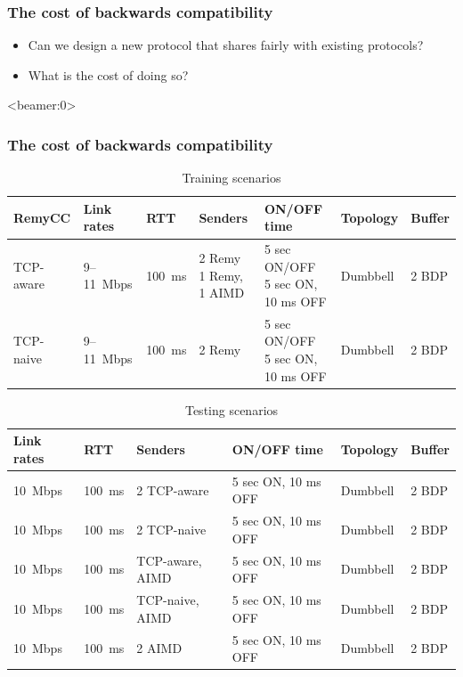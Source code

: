 \begin{frame}
\frametitle{The cost of backwards compatibility}
\begin{center}
\begin{itemize}
\item<1-> Can we design a new protocol that shares fairly with existing protocols?
\item<2-> What is the cost of doing so?
\end{itemize}
\end{center}
\end{frame}

\begin{frame}<beamer:0>
\frametitle{The cost of backwards compatibility}
\begin{table}
\begin{center}
\begin{tiny}
\begin{tabular}{l|l|l|l|l|l|l|}
\bf RemyCC & \bf Link rates & \bf RTT & \bf Senders & ON/OFF time & Topology & Buffer \\
\hline
TCP-aware  & 9--11~Mbps & 100~ms & \pbox{2.5cm}{2 Remy \\ 1 Remy, 1 AIMD}  & \pbox{2.5cm}{5 sec ON/OFF \\ 5 sec ON, 10 ms OFF} & Dumbbell & 2 BDP\\
\hline
TCP-naive  & 9--11~Mbps & 100~ms & 2 Remy  & \pbox{2.5cm}{5 sec ON/OFF \\ 5 sec ON, 10 ms OFF} & Dumbbell & 2 BDP\\
\hline
\end{tabular}
\end{tiny}
\caption{Training scenarios}
\label{table:oprange}
\end{center}
\end{table}
\begin{table}
\begin{center}
\begin{tiny}
\begin{tabular}{l|l|l|l|l|l|}
\bf Link rates & \bf RTT & \bf Senders & ON/OFF time & Topology & Buffer \\
\hline
10~Mbps & 100~ms & 2 TCP-aware & 5 sec ON, 10 ms OFF & Dumbbell & 2 BDP\\
10~Mbps & 100~ms & 2 TCP-naive & 5 sec ON, 10 ms OFF & Dumbbell & 2 BDP\\
10~Mbps & 100~ms & TCP-aware, AIMD & 5 sec ON, 10 ms OFF & Dumbbell & 2 BDP\\
10~Mbps & 100~ms & TCP-naive, AIMD & 5 sec ON, 10 ms OFF & Dumbbell & 2 BDP\\
10~Mbps & 100~ms & 2 AIMD  & 5 sec ON, 10 ms OFF & Dumbbell & 2 BDP\\
\end{tabular}
\end{tiny}
\caption{Testing scenarios}
\label{table:oprange}
\end{center}
\end{table}

\end{frame}


